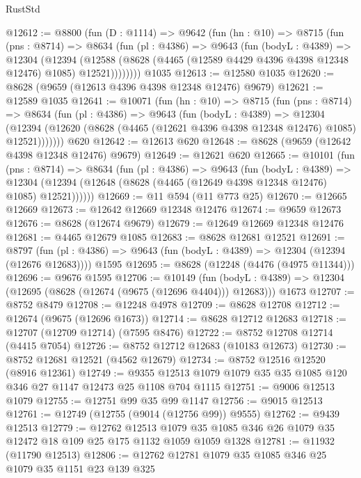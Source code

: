 \begin{lexlean}{RustStd}
\begin{coremodule}
@12612 := @8800
    (fun (D : @1114) =>
    @9642
      (fun (hn : @10) =>
      @8715
        (fun (pns : @8714) =>
        @8634
          (fun (pl : @4386) =>
          @9643
            (fun (bodyL : @4389) =>
            @12304
              (@12394
                (@12588 (@8628 (@4465 (@12589 @4429 @4396 @4398 @12348 @12476) @1085) @12521))))))))
    @1035
@12613 := @12580 @1035
@12620 := @8628 (@9659 (@12613 @4396 @4398 @12348 @12476) @9679)
@12621 := @12589 @1035
@12641 := @10071
    (fun (hn : @10) =>
    @8715
      (fun (pns : @8714) =>
      @8634
        (fun (pl : @4386) =>
        @9643
          (fun (bodyL : @4389) =>
          @12304
            (@12394 (@12620 (@8628 (@4465 (@12621 @4396 @4398 @12348 @12476) @1085) @12521)))))))
    @620
@12642 := @12613 @620
@12648 := @8628 (@9659 (@12642 @4398 @12348 @12476) @9679)
@12649 := @12621 @620
@12665 := @10101
    (fun (pns : @8714) =>
    @8634
      (fun (pl : @4386) =>
      @9643
        (fun (bodyL : @4389) =>
        @12304 (@12394 (@12648 (@8628 (@4465 (@12649 @4398 @12348 @12476) @1085) @12521))))))
@12669 := @11 @594 (@11 @773 @25)
@12670 := @12665 @12669
@12673 := @12642 @12669 @12348 @12476
@12674 := @9659 @12673
@12676 := @8628 (@12674 @9679)
@12679 := @12649 @12669 @12348 @12476
@12681 := @4465 @12679 @1085
@12683 := @8628 @12681 @12521
@12691 := @8797
    (fun (pl : @4386) => @9643 (fun (bodyL : @4389) => @12304 (@12394 (@12676 @12683))))
    @1595
@12695 := @8628 (@12248 (@4476 (@4975 @11344)))
@12696 := @9676 @1595
@12706 := @10149
    (fun (bodyL : @4389) => @12304 (@12695 (@8628 (@12674 (@9675 (@12696 @4404))) @12683)))
    @1673
@12707 := @8752 @8479
@12708 := @12248 @4978
@12709 := @8628 @12708
@12712 := @12674 (@9675 (@12696 @1673))
@12714 := @8628 @12712 @12683
@12718 := @12707 (@12709 @12714) (@7595 @8476)
@12722 := @8752 @12708 @12714 (@4415 @7054)
@12726 := @8752 @12712 @12683 (@10183 @12673)
@12730 := @8752 @12681 @12521 (@4562 @12679)
@12734 := @8752 @12516 @12520 (@8916 @12361)
@12749 := @9355 @12513 @1079 @1079 @35 @35 @1085 @120 @346 @27 @1147 @12473 @25 @1108 @704 @1115
@12751 := @9006 @12513 @1079
@12755 := @12751 @99 @35 @99 @1147
@12756 := @9015 @12513
@12761 := @12749 (@12755 (@9014 (@12756 @99)) @9555)
@12762 := @9439 @12513
@12779 := @12762
    @12513
    @1079
    @35
    @1085
    @346
    @26
    @1079
    @35
    @12472
    @18
    @109
    @25
    @175
    @1132
    @1059
    @1059
    @1328
@12781 := @11932 (@11790 @12513)
@12806 := @12762
    @12781
    @1079
    @35
    @1085
    @346
    @25
    @1079
    @35
    @1151
    @23
    @139
    @325

\end{coremodule}
\end{lexlean}
